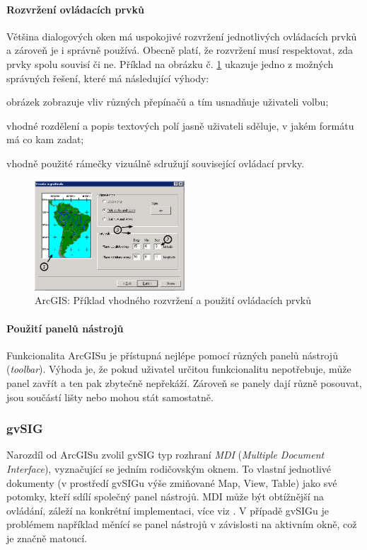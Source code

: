 \documentclass[a4paper,12pt,draft]{article}
\begin{document}
{\paragraph*{Rozvržení ovládacích prvků}
Většina dialogových oken má uspokojivé rozvržení jednotlivých
ovládacích prvků a zároveň je i správně používá. Obecně platí,
že rozvržení musí respektovat, zda prvky spolu souvisí či ne. Příklad
na obrázku č. \ref{fig:ArcGIS_graticule_wizard} ukazuje jedno z možných
správných řešení, které má následující výhody:
\begin{inparaenum}[\itshape 1\upshape)]
\item obrázek zobrazuje vliv různých přepínačů a tím usnadňuje
uživateli volbu;
\item vhodné rozdělení a popis textových polí jasně uživateli sděluje,
v jakém formátu má co kam zadat;
\item vhodně použité rámečky vizuálně sdružují související
ovládací prvky.
\end{inparaenum}


\begin{figure}[h!]
\centering
\includegraphics[width=0.5\textwidth]{./GUI_screenshots/ArcGIS_graticule_wizard.png}
\caption{ArcGIS: Příklad vhodného rozvržení a použití ovládacích
prvků}
\label{fig:ArcGIS_graticule_wizard}
\end{figure}

\paragraph*{Použití panelů nástrojů}
Funkcionalita ArcGISu je přístupná nejlépe pomocí různých panelů
nástrojů (\emph{toolbar}). Výhoda je, že pokud uživatel určitou
funkcionalitu nepotřebuje, může panel zavřít a ten pak zbytečně
nepřekáží. Zároveň se panely dají různě posouvat, jsou součástí
lišty nebo mohou stát samostatně.






\subsubsection{gvSIG}
Narozdíl od ArcGISu zvolil gvSIG typ rozhraní \emph{MDI} (\emph{Multiple
Document Interface}),  vyznačující se jedním rodičovským oknem. To vlastní
jednotlivé dokumenty (v prostředí gvSIGu výše zmiňované Map, View, Table) jako
své potomky, kteří sdílí společný panel nástrojů. MDI může být obtížnější na
ovládání, záleží na konkrétní implementaci, více viz \cite{wiki_MDI}. V případě
gvSIGu je problémem například  měnící se panel nástrojů v závislosti na aktivním
okně, což je značně matoucí.

}
\end{document}

